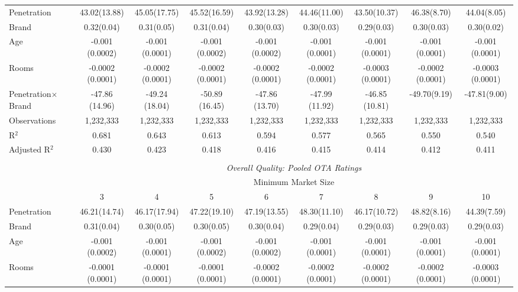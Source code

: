 \begin{table}[!htbp]
\begin{sideways}
{\begin{tabular}{@{\extracolsep{5pt}}lcccccccc}
\hline 
 Penetration & 43.02$ $(13.88) & 45.05$ $(17.75) & 45.52$ $(16.59) & 43.92$ $(13.28) & 44.46$ $(11.00) & 43.50$ $(10.37) & 46.38$ $(8.70) & 44.04$ $(8.05) \\ 
  Brand & 0.32$ $(0.04) & 0.31$ $(0.05) & 0.31$ $(0.04) & 0.30$ $(0.03) & 0.30$ $(0.03) & 0.29$ $(0.03) & 0.30$ $(0.03) & 0.30$ $(0.02) \\ 
  Age & -0.001$ $(0.0002) & -0.001$ $(0.0001) & -0.001$ $(0.0002) & -0.001$ $(0.0002) & -0.001$ $(0.0001) & -0.001$ $(0.0001) & -0.001$ $(0.0001) & -0.001$ $(0.0001) \\ 
  Rooms & -0.0002$ $(0.0001) & -0.0002$ $(0.0001) & -0.0002$ $(0.0001) & -0.0002$ $(0.0001) & -0.0002$ $(0.0001) & -0.0003$ $(0.0001) & -0.0002$ $(0.0001) & -0.0003$ $(0.0001) \\   
  Penetration$\times$Brand & -47.86$ $(14.96) & -49.24$ $(18.04) & -50.89$ $(16.45) & -47.86$ $(13.70) & -47.99$ $(11.92) & -46.85$ $(10.81) & -49.70$ $(9.19) & -47.81$ $(9.00) \\ 
 \hline
Observations & 1,232,333 & 1,232,333 & 1,232,333 & 1,232,333 & 1,232,333 & 1,232,333 & 1,232,333 & 1,232,333 \\ 
R$^{2}$ & 0.681 & 0.643 & 0.613 & 0.594 & 0.577 & 0.565 & 0.550 & 0.540 \\ 
Adjusted R$^{2}$ & 0.430 & 0.423 & 0.418 & 0.416 & 0.415 & 0.414 & 0.412 & 0.411 \\ 
\hline 
\\[-1.8ex]
& \multicolumn{8}{c}{\textit{Overall Quality: Pooled OTA Ratings}} \\ 
\cline{2-9} 
& \multicolumn{8}{c}{Minimum Market Size} \\ 
 & 3 & 4 & 5 & 6 & 7 & 8 & 9 & 10\\ 
\hline  
 Penetration & 46.21$ $(14.74) & 46.17$ $(17.94) & 47.22$ $(19.10) & 47.19$ $(13.55) & 48.30$ $(11.10) & 46.17$ $(10.72) & 48.82$ $(8.16) & 44.39$ $(7.59) \\ 
  Brand & 0.31$ $(0.04) & 0.30$ $(0.05) & 0.30$ $(0.05) & 0.30$ $(0.04) & 0.29$ $(0.04) & 0.29$ $(0.03) & 0.29$ $(0.03) & 0.29$ $(0.03) \\ 
  Age & -0.001$ $(0.0002) & -0.001$ $(0.0001) & -0.001$ $(0.0002) & -0.001$ $(0.0002) & -0.001$ $(0.0001) & -0.001$ $(0.0001) & -0.001$ $(0.0001) & -0.001$ $(0.0001) \\
  Rooms & -0.0001$ $(0.0001) & -0.0001$ $(0.0001) & -0.0001$ $(0.0001) & -0.0002$ $(0.0001) & -0.0002$ $(0.0001) & -0.0002$ $(0.0001) & -0.0002$ $(0.0001) & -0.0003$ $(0.0001) \\ 

\end{tabular}}
\end{sideways}
\end{table}
